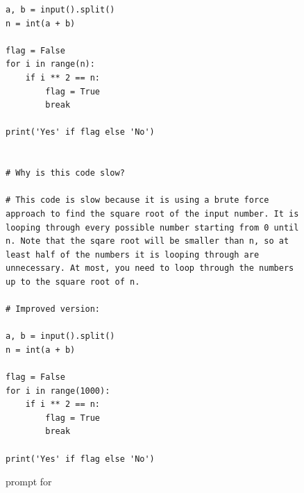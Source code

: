 \begin{figure}
    \begin{verbatim}
a, b = input().split()
n = int(a + b)

flag = False
for i in range(n):
    if i ** 2 == n:
        flag = True
        break

print('Yes' if flag else 'No')


# Why is this code slow?

# This code is slow because it is using a brute force approach to find the square root of the input number. It is looping through every possible number starting from 0 until n. Note that the sqare root will be smaller than n, so at least half of the numbers it is looping through are unnecessary. At most, you need to loop through the numbers up to the square root of n.

# Improved version:

a, b = input().split()
n = int(a + b)

flag = False
for i in range(1000):
    if i ** 2 == n:
        flag = True
        break

print('Yes' if flag else 'No')
\end{verbatim}
\caption{\itermod prompt for \codeopt}
\label{fig:prompt:pie:refine}
\end{figure}
